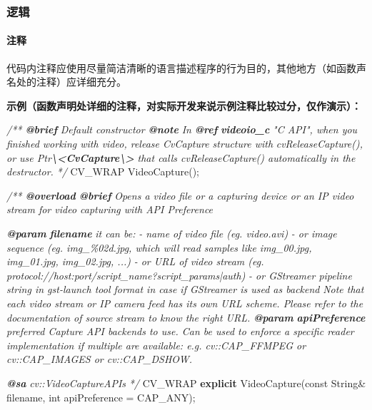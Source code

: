 \documentclass[
]{article}
\newenvironment{Shaded}{}{}
\newcommand{\AnnotationTok}[1]{\textcolor[rgb]{0.38,0.63,0.69}{\textbf{\textit{#1}}}}
\newcommand{\AttributeTok}[1]{\textcolor[rgb]{0.49,0.56,0.16}{#1}}
\newcommand{\CommentTok}[1]{\textcolor[rgb]{0.38,0.63,0.69}{\textit{#1}}}
\newcommand{\CommentVarTok}[1]{\textcolor[rgb]{0.38,0.63,0.69}{\textbf{\textit{#1}}}}
\newcommand{\DataTypeTok}[1]{\textcolor[rgb]{0.56,0.13,0.00}{#1}}
\newcommand{\InformationTok}[1]{\textcolor[rgb]{0.38,0.63,0.69}{\textbf{\textit{#1}}}}
\newcommand{\KeywordTok}[1]{\textcolor[rgb]{0.00,0.44,0.13}{\textbf{#1}}}
\newcommand{\NormalTok}[1]{#1}
\newcommand{\OperatorTok}[1]{\textcolor[rgb]{0.40,0.40,0.40}{#1}}
\begin{document}
\hypertarget{ux903bux8f91}{%
\subsubsection{逻辑}\label{ux903bux8f91}}

\hypertarget{ux6ce8ux91ca-2}{%
\paragraph{\texorpdfstring{注释 }{注释 }}\label{ux6ce8ux91ca-2}}

代码内注释应使用尽量简洁清晰的语言描述程序的行为目的，其他地方（如函数声名处的注释）应详细充分。

\textbf{示例（函数声明处详细的注释，对实际开发来说示例注释比较过分，仅作演示）：}

\begin{Shaded}
\begin{Highlighting}[]
\CommentTok{/** }\AnnotationTok{@brief}\CommentTok{ Default constructor}
\InformationTok{@note}\CommentTok{ In }\AnnotationTok{@ref}\CommentTok{ }\CommentVarTok{videoio\_c}\CommentTok{ "C API", when you finished working with video, release CvCapture structure with}
\CommentTok{cvReleaseCapture(), or use Ptr}\AnnotationTok{\textbackslash{}\textless{}CvCapture\textbackslash{}\textgreater{}}\CommentTok{ that calls cvReleaseCapture() automatically in the}
\CommentTok{destructor.}
\CommentTok{ */}
\NormalTok{CV\_WRAP VideoCapture}\OperatorTok{();}

\CommentTok{/** }\AnnotationTok{@overload}
\AnnotationTok{@brief}\CommentTok{  Opens a video file or a capturing device or an IP video stream for video capturing with API Preference}

\AnnotationTok{@param}\CommentTok{ }\CommentVarTok{filename}\CommentTok{ it can be:}
\CommentTok{{-} name of video file (eg. \textasciigrave{}video.avi\textasciigrave{})}
\CommentTok{{-} or image sequence (eg. \textasciigrave{}img\_\%02d.jpg\textasciigrave{}, which will read samples like \textasciigrave{}img\_00.jpg, img\_01.jpg, img\_02.jpg, ...\textasciigrave{})}
\CommentTok{{-} or URL of video stream (eg. \textasciigrave{}protocol://host:port/script\_name?script\_params|auth\textasciigrave{})}
\CommentTok{{-} or GStreamer pipeline string in gst{-}launch tool format in case if GStreamer is used as backend}
\CommentTok{  Note that each video stream or IP camera feed has its own URL scheme. Please refer to the}
\CommentTok{  documentation of source stream to know the right URL.}
\AnnotationTok{@param}\CommentTok{ }\CommentVarTok{apiPreference}\CommentTok{ preferred Capture API backends to use. Can be used to enforce a specific reader}
\CommentTok{implementation if multiple are available: e.g. cv::CAP\_FFMPEG or cv::CAP\_IMAGES or cv::CAP\_DSHOW.}

\AnnotationTok{@sa}\CommentTok{ cv::VideoCaptureAPIs}
\CommentTok{*/}
\NormalTok{CV\_WRAP }\KeywordTok{explicit}\NormalTok{ VideoCapture}\OperatorTok{(}\AttributeTok{const}\NormalTok{ String}\OperatorTok{\&}\NormalTok{ filename}\OperatorTok{,} \DataTypeTok{int}\NormalTok{ apiPreference }\OperatorTok{=}\NormalTok{ CAP\_ANY}\OperatorTok{);}
\end{Highlighting}
\end{Shaded}
\end{document}
